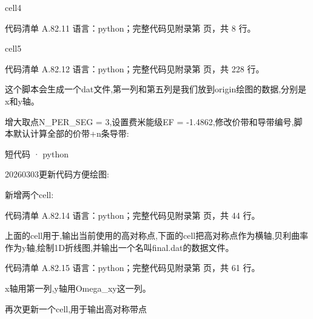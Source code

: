\documentclass[lang=cn,scheme=chinese,color=blue,device=normal,toc=onecol,math=cm]{elegantbook}
\begin{document}
cell4\par


\begin{codeindexbox}{代码清单 A.82.11}
语言：python；完整代码见附录第 \pageref{code:82:11} 页，共 8 行。
\end{codeindexbox}


cell5\par


\begin{codeindexbox}{代码清单 A.82.12}
语言：python；完整代码见附录第 \pageref{code:82:12} 页，共 228 行。
\end{codeindexbox}


这个脚本会生成一个dat文件,第一列和第五列是我们放到origin绘图的数据,分别是x和y轴。\par


增大取点N\_\allowbreak{}PER\_\allowbreak{}SEG = 3,设置费米能级EF = -1.4862,修改价带和导带编号,脚本默认计算全部的价带+n条导带:\par


\begin{inlinecodebox}{短代码 · python}
\end{inlinecodebox}


20260303更新代码方便绘图:\par


新增两个cell:\par


\begin{codeindexbox}{代码清单 A.82.14}
语言：python；完整代码见附录第 \pageref{code:82:14} 页，共 44 行。
\end{codeindexbox}


上面的cell用于,输出当前使用的高对称点,下面的cell把高对称点作为横轴,贝利曲率作为y轴,绘制1D折线图,并输出一个名叫final.dat的数据文件。\par


\begin{codeindexbox}{代码清单 A.82.15}
语言：python；完整代码见附录第 \pageref{code:82:15} 页，共 61 行。
\end{codeindexbox}


x轴用第一列,y轴用Omega\_\allowbreak{}xy这一列。\par


再次更新一个cell,用于输出高对称带点\par
\end{document}
